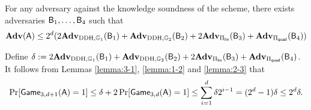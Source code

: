\begin{corollary} For any adversary against the knowledge soundness of the scheme, there exists adversaries $\mathsf{B}_1,\ldots,\mathsf{B}_4$ such that
$$
\mathbf{Adv}(\mathsf{A}) \leq 2^d(2\mathbf{Adv}_{\mathrm{DDH},\mathbb{G}_1}(\mathsf{B}_1)+\mathbf{Adv}_{\mathrm{DDH},\mathbb{G}_2}(\mathsf{B}_2)+2\mathbf{Adv}_{\Pi_\mathsf{lin}}(\mathsf{B}_3)+\mathbf{Adv}_{\Pi_\mathsf{quad}}(\mathsf{B}_4))
$$
\end{corollary}
Define $\delta :=2\mathbf{Adv}_{\mathrm{DDH},\mathbb{G}_1}(\mathsf{B}_1)+\mathbf{Adv}_{\mathrm{DDH},\mathbb{G}_2}(\mathsf{B}_2)+2\mathbf{Adv}_{\Pi_\mathsf{lin}}(\mathsf{B}_3)+\mathbf{Adv}_{\Pi_\mathsf{quad}}(\mathsf{B}_4)$.
It follows from Lemmas \ref{lemma:3-1}, \ref{lemma:1-2} and \ref{lemma:2-3} that 
$$
\Pr[\mathsf{Game}_{3,d+1}(\mathsf{A})=1] \leq \delta + 2\Pr[\mathsf{Game}_{3,d}(\mathsf{A})=1] \leq \sum_{i=1}^d \delta2^{i-1} = (2^{d}-1)\delta \leq 2^d\delta.
$$
\newpage
